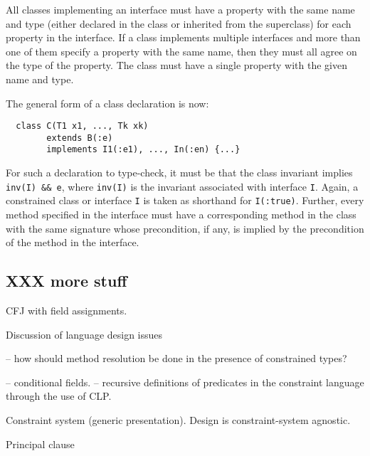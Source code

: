 All classes implementing an interface must have a property
with the same name and
type (either declared in the class or inherited from the superclass)
for each property in the interface. If a class implements
multiple interfaces and more than one of them specify a property
with the same name, then they must all agree on the type of the
property. The class must have a single property with the given name
and type.

The general form of a class declaration is now:
\begin{verbatim}
  class C(T1 x1, ..., Tk xk)
        extends B(:e)
        implements I1(:e1), ..., In(:en) {...}
\end{verbatim}
\noindent
For such a
declaration to type-check, it must be that the class invariant
implies {\tt inv(I) \&\& e}, where {\tt inv(I)} is the invariant associated with
interface {\tt I}.  Again, a constrained class or interface {\tt I} is taken as
shorthand for {\tt I(:true)}.  Further, every method specified in the
interface must have a corresponding method in the class with the same
signature whose precondition, if any, is implied by the precondition
of the method in the interface.


\subsection{XXX more stuff}

CFJ with field assignments.

Discussion of language design issues

-- how should method resolution be done in the presence of constrained
   types?

-- conditional fields.
-- recursive definitions of predicates in the constraint language
   through the use of CLP.

Constraint system (generic presentation).
Design is constraint-system agnostic.

Principal clause

